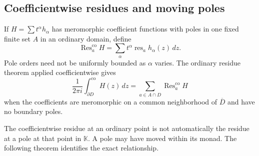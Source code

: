 \documentclass[11pt,a4paper]{article}
\numberwithin{equation}{section}
\theoremstyle{definition}
\theoremstyle{remark}
\newcommand{\K}{\mathbb K}
\newcommand{\res}{\operatorname{res}}
\newcommand{\Res}{\operatorname{Res}}
\newcommand{\co}{\mathrm{co}}
\begin{document}
\subsection{Coefficientwise residues and moving poles}
If $H=\sum t^\alpha h_\alpha$ has meromorphic coefficient functions with poles in one fixed finite set $A$ in an ordinary domain, define
\[
 \Res^{\co}_aH=\sum_\alpha t^\alpha\res_a h_\alpha(z)\,dz.
\]
Pole orders need not be uniformly bounded as $\alpha$ varies. The ordinary residue theorem applied coefficientwise gives
\begin{equation}
\label{eq:cores}
 \frac1{2\pi i}\int_{\partial D}^{\co}H(z)\,dz
 =\sum_{a\in A\cap D}\Res^{\co}_aH
\end{equation}
when the coefficients are meromorphic on a common neighborhood of $\overline D$ and have no boundary poles.

The coefficientwise residue at an ordinary point is not automatically the residue at a pole at that point in $\K$. A pole may have moved within its monad. The following theorem identifies the exact relationship.
\end{document}
